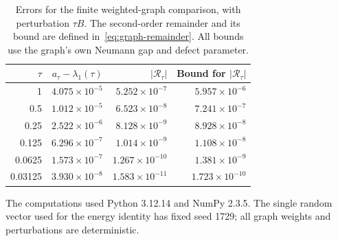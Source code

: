 \begin{table}[htbp]
\centering
\small
\begin{tabular}{rrrr}
\toprule
$\tau$ & $a_\tau-\lambda_1(\tau)$ & $|\mathcal R_\tau|$ & Bound for $|\mathcal R_\tau|$ \\
\midrule
1 & $4.075\times10^{-5}$ & $5.252\times10^{-7}$ & $5.957\times10^{-6}$ \\
0.5 & $1.012\times10^{-5}$ & $6.523\times10^{-8}$ & $7.241\times10^{-7}$ \\
0.25 & $2.522\times10^{-6}$ & $8.128\times10^{-9}$ & $8.928\times10^{-8}$ \\
0.125 & $6.296\times10^{-7}$ & $1.014\times10^{-9}$ & $1.108\times10^{-8}$ \\
0.0625 & $1.573\times10^{-7}$ & $1.267\times10^{-10}$ & $1.381\times10^{-9}$ \\
0.03125 & $3.930\times10^{-8}$ & $1.583\times10^{-11}$ & $1.723\times10^{-10}$ \\
\bottomrule
\end{tabular}
\caption{Errors for the finite weighted-graph comparison, with perturbation $\tau B$. The second-order remainder and its bound are defined in~\eqref{eq:graph-remainder}.  All bounds use the graph's own Neumann gap and defect parameter.}
\label{tab:graph-checks}
\end{table}
The computations used Python 3.12.14 and NumPy 2.3.5. The single random vector used for the energy identity has fixed seed 1729; all graph weights and perturbations are deterministic.
